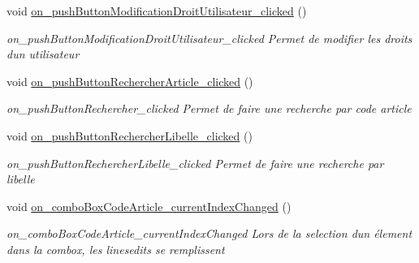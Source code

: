 \begin{DoxyCompactItemize}
\mbox{\label{class_main_window_abd6b33ed53db0030254a2d77d94cc0f6}} 
void \mbox{\hyperlink{class_main_window_abd6b33ed53db0030254a2d77d94cc0f6}{on\+\_\+push\+Button\+Modification\+Droit\+Utilisateur\+\_\+clicked}} ()
\begin{DoxyCompactList}\small\item\em on\+\_\+push\+Button\+Modification\+Droit\+Utilisateur\+\_\+clicked Permet de modifier les droits d\textquotesingle{}un utilisateur \end{DoxyCompactList}\item 
\mbox{\label{class_main_window_a996886423dd5853b0d5fb4fd873a1cd9}} 
void \mbox{\hyperlink{class_main_window_a996886423dd5853b0d5fb4fd873a1cd9}{on\+\_\+push\+Button\+Rechercher\+Article\+\_\+clicked}} ()
\begin{DoxyCompactList}\small\item\em on\+\_\+push\+Button\+Rechercher\+\_\+clicked Permet de faire une recherche par code article \end{DoxyCompactList}\item 
\mbox{\label{class_main_window_aea6d363938b2777532153de45aca8727}} 
void \mbox{\hyperlink{class_main_window_aea6d363938b2777532153de45aca8727}{on\+\_\+push\+Button\+Rechercher\+Libelle\+\_\+clicked}} ()
\begin{DoxyCompactList}\small\item\em on\+\_\+push\+Button\+Rechercher\+Libelle\+\_\+clicked Permet de faire une recherche par libelle \end{DoxyCompactList}\item 
\mbox{\label{class_main_window_a9d8f9d4996e84cc60843006a3cee3907}} 
void \mbox{\hyperlink{class_main_window_a9d8f9d4996e84cc60843006a3cee3907}{on\+\_\+combo\+Box\+Code\+Article\+\_\+current\+Index\+Changed}} ()
\begin{DoxyCompactList}\small\item\em on\+\_\+combo\+Box\+Code\+Article\+\_\+current\+Index\+Changed Lors de la selection d\textquotesingle{}un élement dans la combox, les linesedits se remplissent \end{DoxyCompactList}\item 
\mbox{\label{class_main_window_a9cd255f49dc0d52a8683d87d7c92ab0e}} 

\end{DoxyCompactItemize}
